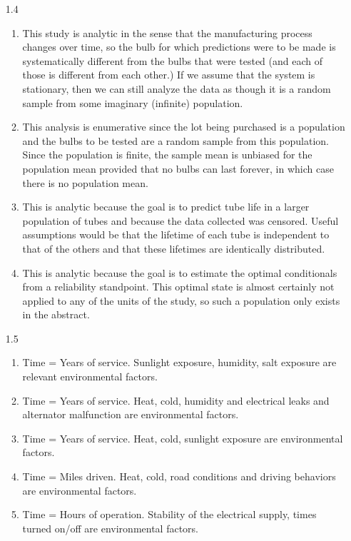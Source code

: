 \documentclass[12pt]{article}\usepackage[]{graphicx}\usepackage[]{color}
\begin{document}
\begin{enumerate}
\begin{enumerate}
  \end{enumerate}

  \item[1.4]
  \begin{enumerate}
    \item
    This study is analytic in the sense that the manufacturing process changes over time, so the bulb for which predictions were to be made is systematically different from the bulbs that were tested (and each of those is different from each other.) If we assume that the system is stationary, then we can still analyze the data as though it is a random sample from some imaginary (infinite) population.
    \item
    This analysis is enumerative since the lot being purchased is a population and the bulbs to be tested are a random sample from this population. Since the population is finite, the sample mean is unbiased for the population mean provided that no bulbs can last forever, in which case there is no population mean.
    \item
    This is analytic because the goal is to predict tube life in a larger population of tubes and because the data collected was censored. Useful assumptions would be that the lifetime of each tube is independent to that of the others and that these lifetimes are identically distributed.
    \item
    This is analytic because the goal is to estimate the optimal conditionals from a reliability standpoint. This optimal state is almost certainly not applied to any of the units of the study, so such a population only exists in the abstract.
  \end{enumerate}
  \item[1.5]
  \begin{enumerate}
    \item
    Time = Years of service. Sunlight exposure, humidity, salt exposure are relevant environmental factors.
    \item
    Time = Years of service. Heat, cold, humidity and electrical leaks and alternator malfunction are environmental factors.
    \item
    Time = Years of service. Heat, cold, sunlight exposure are environmental factors.
    \item
    Time = Miles driven. Heat, cold, road conditions and driving behaviors are environmental factors.
    \item
    Time = Hours of operation. Stability of the electrical supply, times turned on/off are environmental factors.
  \end{enumerate}
  

\end{enumerate}
\end{document}
